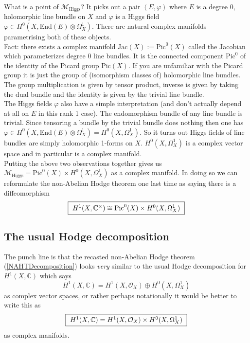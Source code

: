 What is a point of $\mathcal{M}_{\mathrm{Higgs}}$? It picks out a pair $(E,\varphi)$ where $E$ is a degree $0$, holomorphic line bundle on $X$ and $\varphi$ is a Higgs field $\varphi\in H^0 (X,\mathrm{End}(E) \otimes \Omega^1 _X)$. There are natural complex manifolds parametrising both of these objects.\\

Fact: there exists a complex manifold $\textrm{Jac}(X):=\mathrm{Pic} ^0(X)$ called the Jacobian which parameterizes degree 0 line bundles. It is the connected component $\mathrm{Pic} ^0$ of the identity of the Picard group $\textrm{Pic}(X)$. If you are unfamiliar with the Picard group it is just the group of (isomorphism classes of) holomorphic line bundles. The group multiplication is given by tensor product, inverse is given by taking the dual bundle and the identity is given by the trivial line bundle.\\

The Higgs fields $\varphi$ also have a simple interpretation (and don't actually depend at all on $E$ in this rank 1 case). The endomorphism bundle of any line bundle is trivial. Since tensoring a bundle by the trivial bundle does nothing then one has $\varphi\in H^0(X,\mathrm{End}(E) \otimes \Omega^1 _X)=H^0 ( X , \Omega_X ^1 )$. So it turns out Higgs fields of line bundles are simply holomorphic 1-forms on $X$. $H^0 ( X , \Omega_X ^1 )$ is a complex vector space and in particular is a complex manifold.\\

Putting the above two observations together gives us $\mathcal{M}_{\mathrm{Higgs}}=\textrm{Pic}^{0}(X)\times H^0 ( X , \Omega_X ^1)$ as a complex manifold. In doing so we can reformulate the non-Abelian Hodge theorem one last time as saying there is a diffeomorphism
\begin{equation}\label{NAHTDecomposition}
\fbox{
$H^1(X, \mathbb{C}^\times)\cong\mathrm{Pic}^0 (X) \times H^0 (X,\Omega_X ^1 )$
}
\end{equation}

\subsection{The usual Hodge decomposition}

The punch line is that the recasted non-Abelian Hodge theorem (\ref{NAHTDecomposition}) looks \textit{very} similar to the usual Hodge decomposition for $H^1 ( X, \mathbb{C} )$ which says
\begin{equation*}
H^1 (X, \mathbb{C})=H^1 ( X, \mathcal{O} _X ) \oplus H^0 (X,\Omega_X ^1 )
\end{equation*}
as complex vector spaces, or rather perhaps notationally it would be better to write this as
\begin{equation}\label{UsualHodgeDecomposition}
\fbox{
$H^1 (X, \mathbb{C})=H^1 ( X, \mathcal{O} _X )\times H^0 (X,\Omega_X ^1 ) $
}
\end{equation}
as complex manifolds.\\

